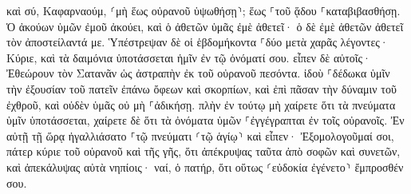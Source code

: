 \documentclass{openreader}
\begin{document}
καὶ σύ, Καφαρναούμ, ⸂μὴ ἕως οὐρανοῦ ὑψωθήσῃ⸃; ἕως ⸀τοῦ ᾅδου ⸀καταβιβασθήσῃ. 
Ὁ ἀκούων ὑμῶν ἐμοῦ ἀκούει, καὶ ὁ ἀθετῶν ὑμᾶς ἐμὲ ἀθετεῖ· ὁ δὲ ἐμὲ ἀθετῶν ἀθετεῖ τὸν ἀποστείλαντά με. 
Ὑπέστρεψαν δὲ οἱ ἑβδομήκοντα ⸀δύο μετὰ χαρᾶς λέγοντες· Κύριε, καὶ τὰ δαιμόνια ὑποτάσσεται ἡμῖν ἐν τῷ ὀνόματί σου. 
εἶπεν δὲ αὐτοῖς· Ἐθεώρουν τὸν Σατανᾶν ὡς ἀστραπὴν ἐκ τοῦ οὐρανοῦ πεσόντα. 
ἰδοὺ ⸀δέδωκα ὑμῖν τὴν ἐξουσίαν τοῦ πατεῖν ἐπάνω ὄφεων καὶ σκορπίων, καὶ ἐπὶ πᾶσαν τὴν δύναμιν τοῦ ἐχθροῦ, καὶ οὐδὲν ὑμᾶς οὐ μὴ ⸀ἀδικήσῃ. 
πλὴν ἐν τούτῳ μὴ χαίρετε ὅτι τὰ πνεύματα ὑμῖν ὑποτάσσεται, χαίρετε δὲ ὅτι τὰ ὀνόματα ὑμῶν ⸀ἐγγέγραπται ἐν τοῖς οὐρανοῖς. 
Ἐν αὐτῇ τῇ ὥρᾳ ἠγαλλιάσατο ⸀τῷ πνεύματι ⸂τῷ ἁγίῳ⸃ καὶ εἶπεν· Ἐξομολογοῦμαί σοι, πάτερ κύριε τοῦ οὐρανοῦ καὶ τῆς γῆς, ὅτι ἀπέκρυψας ταῦτα ἀπὸ σοφῶν καὶ συνετῶν, καὶ ἀπεκάλυψας αὐτὰ νηπίοις· ναί, ὁ πατήρ, ὅτι οὕτως ⸂εὐδοκία ἐγένετο⸃ ἔμπροσθέν σου. 
\end{document}
